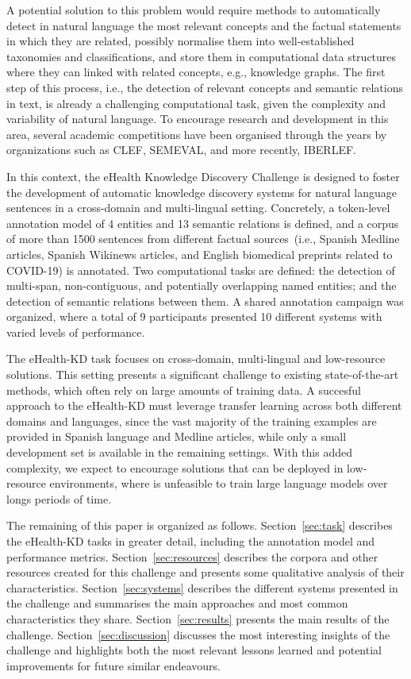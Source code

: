\documentclass[a4paper,11pt,twocolumn,twoside]{article}
\begin{document}
A potential solution to this problem would require methods to automatically detect in natural language the most relevant concepts and the factual statements in which they are related, possibly normalise them into well-established taxonomies and classifications, and store them in computational data structures where they can linked with related concepts, e.g., knowledge graphs.
The first step of this process, i.e., the detection of relevant concepts and semantic relations in text, is already a challenging computational task, given the complexity and variability of natural language.
To encourage research and development in this area, several academic competitions have been organised through the years by organizations such as CLEF, SEMEVAL, and more recently, IBERLEF.

In this context, the eHealth Knowledge Discovery Challenge is designed to foster the development of automatic knowledge discovery systems for natural language sentences in a cross-domain and multi-lingual setting.
Concretely, a token-level annotation model of 4 entities and 13 semantic relations is defined, and a corpus of more than 1500 sentences from different factual sources~(i.e., Spanish Medline articles, Spanish Wikinews articles, and English biomedical preprints related to COVID-19) is annotated.
Two computational tasks are defined: the detection of multi-span, non-contiguous, and potentially overlapping named entities; and the detection of semantic relations between them.
A shared annotation campaign was organized, where a total of 9 participants presented 10 different systems with varied levels of performance.

The eHealth-KD task focuses on cross-domain, multi-lingual and low-resource solutions. This setting presents a significant challenge to existing state-of-the-art methods, which often rely on large amounts of training data.
A succesful approach to the eHealth-KD must leverage transfer learning across both different domains and languages, since the vast majority of the training examples are provided in Spanish language and Medline articles, while only a small development set is available in the remaining settings.
With this added complexity, we expect to encourage solutions that can be deployed in low-resource environments, where is unfeasible to train large language models over longs periods of time.

The remaining of this paper is organized as follows.
Section~\ref{sec:task} describes the eHealth-KD tasks in greater detail, including the annotation model and performance metrics.
Section~\ref{sec:resources} describes the corpora and other resources created for this challenge and presents some qualitative analysis of their characteristics.
Section~\ref{sec:systems} describes the different systems presented in the challenge and summarises the main approaches and most common characteristics they share.
Section~\ref{sec:results} presents the main results of the challenge.
Section~\ref{sec:discussion} discusses the most interesting insights of the challenge and highlights both the most relevant lessons learned and potential improvements for future similar endeavours.
\end{document}
